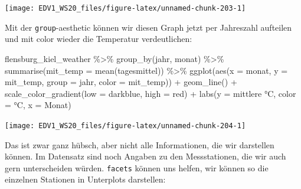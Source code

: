\documentclass[
]{book}
\newenvironment{Shaded}{\begin{snugshade}}{\end{snugshade}}
\newcommand{\AttributeTok}[1]{\textcolor[rgb]{0.77,0.63,0.00}{#1}}
\newcommand{\FunctionTok}[1]{\textcolor[rgb]{0.00,0.00,0.00}{#1}}
\newcommand{\NormalTok}[1]{#1}
\newcommand{\SpecialCharTok}[1]{\textcolor[rgb]{0.00,0.00,0.00}{#1}}
\newcommand{\StringTok}[1]{\textcolor[rgb]{0.31,0.60,0.02}{#1}}
\begin{document}
\begin{center}\texttt{[image: EDV1\_WS20\_files/figure-latex/unnamed-chunk-203-1]} \end{center}

Mit der \texttt{group}-aesthetic können wir diesen Graph jetzt per Jahreszahl aufteilen und mit color wieder die Temperatur verdeutlichen:

\begin{Shaded}
\begin{Highlighting}[]
\NormalTok{flensburg\_kiel\_weather }\SpecialCharTok{\%\textgreater{}\%} 
  \FunctionTok{group\_by}\NormalTok{(jahr, monat) }\SpecialCharTok{\%\textgreater{}\%} 
  \FunctionTok{summarise}\NormalTok{(}\AttributeTok{mit\_temp =} \FunctionTok{mean}\NormalTok{(tagesmittel)) }\SpecialCharTok{\%\textgreater{}\%} 
  \FunctionTok{ggplot}\NormalTok{(}\FunctionTok{aes}\NormalTok{(}\AttributeTok{x =}\NormalTok{ monat, }
             \AttributeTok{y =}\NormalTok{ mit\_temp,}
             \AttributeTok{group =}\NormalTok{ jahr,}
             \AttributeTok{color =}\NormalTok{ mit\_temp)) }\SpecialCharTok{+}
  \FunctionTok{geom\_line}\NormalTok{() }\SpecialCharTok{+}
  \FunctionTok{scale\_color\_gradient}\NormalTok{(}\AttributeTok{low =} \StringTok{\textquotesingle{}darkblue\textquotesingle{}}\NormalTok{,}
                       \AttributeTok{high =} \StringTok{\textquotesingle{}red\textquotesingle{}}\NormalTok{) }\SpecialCharTok{+}
  \FunctionTok{labs}\NormalTok{(}\AttributeTok{y =} \StringTok{\textquotesingle{}mittlere °C\textquotesingle{}}\NormalTok{,}
       \AttributeTok{color =} \StringTok{\textquotesingle{}°C\textquotesingle{}}\NormalTok{,}
       \AttributeTok{x =} \StringTok{\textquotesingle{}Monat\textquotesingle{}}\NormalTok{)}
\end{Highlighting}
\end{Shaded}

\begin{center}\texttt{[image: EDV1\_WS20\_files/figure-latex/unnamed-chunk-204-1]} \end{center}

Das ist zwar ganz hübsch, aber nicht alle Informationen, die wir darstellen können.
Im Datensatz sind noch Angaben zu den Messstationen, die wir auch gern unterscheiden würden.
\texttt{facets} können uns helfen, wir können so die einzelnen Stationen in Unterplots darstellen:
\end{document}
